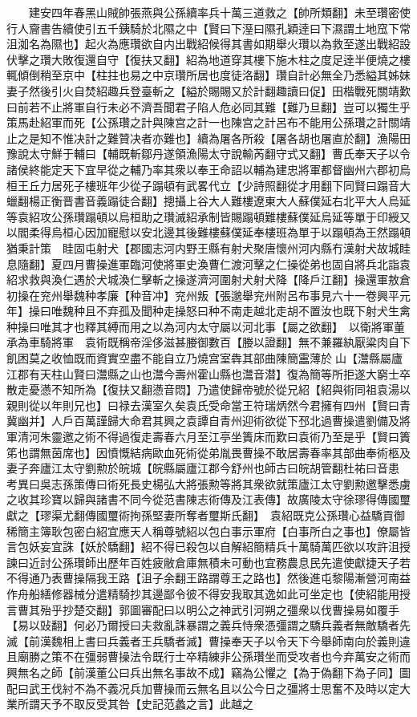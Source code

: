 　　建安四年春黑山賊帥張燕與公孫續率兵十萬三道救之【帥所類翻】未至瓚密使行人齎書告續使引五千銕騎於北隰之中【賢曰下溼曰隰孔穎逹曰下濕謂土地窊下常沮洳名為隰也】起火為應瓚欲自内出戰紹候得其書如期舉火瓚以為救至遂出戰紹設伏擊之瓚大敗復還自守【復扶又翻】紹為地道穿其樓下施木柱之度足逹半便燒之樓輒傾倒稍至京中【柱拄也易之中京瓚所居也度徒洛翻】瓚自計必無全乃悉縊其姊妹妻子然後引火自焚紹趣兵登臺斬之【縊於賜賜又於計翻趣讀曰促】田楷戰死關靖歎曰前若不止將軍自行未必不濟吾聞君子陷人危必同其難【難乃旦翻】豈可以獨生乎策馬赴紹軍而死【公孫瓚之計與陳宫之計一也陳宫之計呂布不能用公孫瓚之計關靖止之是知不惟决計之難贊决者亦難也】續為屠各所殺【屠各胡也屠直於翻】漁陽田豫說太守鮮于輔曰【輔既斬鄒丹遂領漁陽太守說輸芮翻守式又翻】曹氏奉天子以令諸侯終能定天下宜早從之輔乃率其衆以奉王命詔以輔為建忠將軍都督幽州六郡初烏桓王丘力居死子樓班年少從子蹋頓有武畧代立【少詩照翻從才用翻下同賢曰蹋音大蠟翻楊正衡晋書音義蹋徒合翻】摠攝上谷大人難樓遼東大人蘇僕延右北平大人烏延等袁紹攻公孫瓚蹋頓以烏桓助之瓚滅紹承制皆賜蹋頓難樓蘇僕延烏延等單于印綬又以閻柔得烏桓心因加寵慰以安北邊其後難樓蘇僕延奉樓班為單于以蹋頓為王然蹋頓猶秉計策　眭固屯射犬【郡國志河内野王縣有射犬聚唐懷州河内縣冇漢射犬故城眭息隨翻】夏四月曹操進軍臨河使將軍史渙曹仁渡河擊之仁操從弟也固自將兵北詣袁紹求救與渙仁遇於犬城渙仁擊斬之操遂濟河圍射犬射犬降【降戶江翻】操還軍敖倉初操在兖州舉魏种孝廉【种音冲】兖州叛【張邈舉兖州附呂布事見六十一卷興平元年】操曰唯魏种且不弃孤及聞种走操怒曰种不南走越北走胡不置汝也既下射犬生禽种操曰唯其才也釋其縛而用之以為河内太守屬以河北事【屬之欲翻】　以衛將軍董承為車騎將軍　袁術既稱帝淫侈滋甚媵御數百【媵以證翻】無不兼羅紈厭粱肉自下飢困莫之收恤既而資實空盡不能自立乃燒宫室犇其部曲陳簡靁薄於山【灊縣屬廬江郡有天柱山賢曰灊縣之山也灊今壽州霍山縣也灊音潜】復為簡等所拒遂大窮士卒散走憂懣不知所為【復扶又翻懣音悶】乃遣使歸帝號於從兄紹【紹與術同祖袁湯以親則從以年則兄也】曰禄去漢室久矣袁氏受命當王符瑞炳然今君擁有四州【賢曰青冀幽并】人戶百萬謹歸大命君其興之袁譚自青州迎術欲從下邳北過曹操遣劉備及將軍清河朱靈邀之術不得過復走壽春六月至江亭坐簀床而歎曰袁術乃至是乎【賢曰簀笫也謂無茵席也】因憤慨結病歐血死術從弟胤畏曹操不敢居壽春率其部曲奉術柩及妻子奔廬江太守劉勲於皖城【皖縣屬廬江郡今舒州也師古曰皖胡管翻杜祐曰音患　考異曰吳志孫策傳曰術死長史楊弘大將張勲等將其衆欲就策廬江太守劉勲邀擊悉虜之收其珍寶以歸與諸書不同今從范書陳志術傳及江表傳】故廣陵太守徐璆得傳國璽獻之【璆渠尤翻傳國璽術拘孫堅妻所奪者璽斯氏翻】　袁紹既克公孫瓚心益驕貢御稀簡主簿耿包密白紹宜應天人稱尊號紹以包白事示軍府【白事所白之事也】僚屬皆言包妖妄宜誅【妖於驕翻】紹不得已殺包以自解紹簡精兵十萬騎萬匹欲以攻許沮授諫曰近討公孫瓚師出歷年百姓疲敝倉庫無積未可動也宜務農息民先遣使獻捷天子若不得通乃表曹操隔我王路【沮子余翻王路謂尊王之路也】然後進屯黎陽漸營河南益作舟船繕修器械分遣精騎抄其邊鄙令彼不得安我取其逸如此可坐定也【使紹能用授言曹其殆乎抄楚交翻】郭圖審配曰以明公之神武引河朔之彊衆以伐曹操易如覆手【易以䜴翻】何必乃爾授曰夫救亂誅暴謂之義兵恃衆憑彊謂之驕兵義者無敵驕者先滅【前漢魏相上書曰兵義者王兵驕者滅】曹操奉天子以令天下今舉師南向於義則違且廟勝之策不在彊弱曹操法令既行士卒精練非公孫瓚坐而受攻者也今弃萬安之術而興無名之師【前漢董公曰兵出無名事故不成】竊為公懼之【為于偽翻下為子同】圖配曰武王伐紂不為不義况兵加曹操而云無名且以公今日之彊將士思奮不及時以定大業所謂天予不取反受其咎【史記范蠡之言】此越之